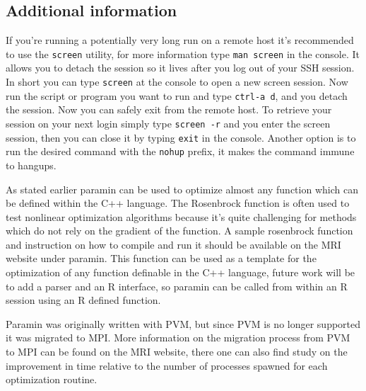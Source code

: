 \documentclass[10pt,twoside]{book}
\begin{document}
\subsection{Additional information}
If you're running a potentially very long run on a remote host it's recommended to use the \texttt{screen} utility, for more information type \texttt{man screen} in the console.  It allows you to detach the session so it lives after you log out of your SSH session.  In short you can type \texttt{screen} at the console to open a new screen session.  Now run the script or program you want to run and type \texttt{ctrl-a d}, and you detach the session.  Now you can safely exit from the remote host. To retrieve your session on your next login simply type \texttt{screen -r} and you enter the screen session, then you can close it by typing \texttt{exit} in the console. Another option is to run the desired command with the \texttt{nohup} prefix, it makes the command immune to hangups.

As stated earlier paramin can be used to optimize almost any function which can be defined within the C++ language.  The Rosenbrock function is often used to test nonlinear optimization algorithms because it's quite challenging for methods which do not rely on the gradient of the function.  A sample rosenbrock function and instruction on how to compile and run it should be available on the MRI website under paramin. This function can be used as a template for the optimization of any function definable in the C++ language, future work will be to add a parser and an R interface, so paramin can be called from within an R session using an R defined function.

Paramin was originally written with PVM, but since PVM is no longer supported it was migrated to MPI.  More information on the migration process from PVM to MPI can be found on the MRI website, there one can also find study on the improvement in time relative to the number of processes spawned for each optimization routine.
\end{document}
